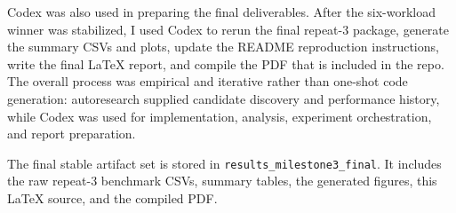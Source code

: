 \documentclass[11pt]{article}
\begin{document}
Codex was also used in preparing the final deliverables. After the six-workload winner was stabilized, I used Codex to rerun the final repeat-3 package, generate the summary CSVs and plots, update the README reproduction instructions, write the final \LaTeX{} report, and compile the PDF that is included in the repo. The overall process was empirical and iterative rather than one-shot code generation: autoresearch supplied candidate discovery and performance history, while Codex was used for implementation, analysis, experiment orchestration, and report preparation.

The final stable artifact set is stored in \texttt{results\_milestone3\_final}. It includes the raw repeat-3 benchmark CSVs, summary tables, the generated figures, this \LaTeX{} source, and the compiled PDF.
\end{document}
